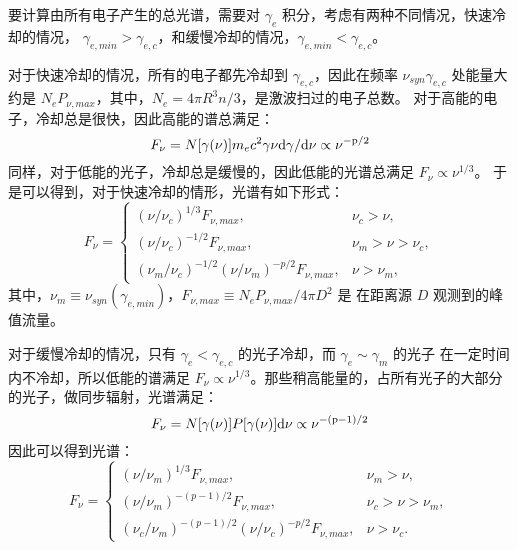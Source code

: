 	要计算由所有电子产生的总光谱，需要对 $\gamma_{e}$ 积分，考虑有两种不同情况，快速冷却的情况，
	$\gamma_{e,min}>\gamma_{e,c}$，和缓慢冷却的情况，$\gamma_{e,min}<\gamma_{e,c}$。

	对于快速冷却的情况，所有的电子都先冷却到 $\gamma_{e,c}$，因此在频率 $\nu_{syn}{\gamma_{e,c}}$
	处能量大约是 $N_{e}P_{\nu,max}$，其中，$N_{e}=4\pi R^{3}n/3$，是激波扫过的电子总数。
	对于高能的电子，冷却总是很快，因此高能的谱总满足：
	\begin{equation}
	F_{\nu}=N[\gamma(\nu)]m_{e}c^{2}\gamma{\nu}\rm{d}\gamma/\rm{d}\nu\propto\nu^{-p/2}
	\end{equation}
	同样，对于低能的光子，冷却总是缓慢的，因此低能的光谱总满足 $F_{\nu}\propto\nu^{1/3}$。
	于是可以得到，对于快速冷却的情形，光谱有如下形式：
	\begin{equation}
	F_\nu=
	\begin{cases}
	( \nu / \nu_c )^{1/3}F_{\nu,max}, & \nu_c>\nu, \\
		( \nu / \nu_c )^{-1/2}F_{\nu,max}, & \nu_m>\nu>\nu_c, \\
		( \nu_m / \nu_c )^{-1/2}( \nu / \nu_m)^{-p/2}F_{\nu,max}, & \nu>\nu_m,
	\end{cases}
	\end{equation}
	其中，$\nu_{m} \equiv \nu_{syn}(\gamma_{e,min})$，$F_{\nu,max}\equiv N_eP_{\nu,max}/4\pi D^2$ 是
	在距离源 $D$ 观测到的峰值流量。

	对于缓慢冷却的情况，只有 $\gamma_{e}<\gamma_{e,c}$ 的光子冷却，而 $\gamma_{e}\sim\gamma_m$ 的光子
	在一定时间内不冷却，所以低能的谱满足 $F_{\nu}\propto\nu^{1/3}$。那些稍高能量的，占所有光子的大部分
	的光子，做同步辐射，光谱满足：
	\begin{equation}
	F_{\nu}=N[\gamma(\nu)]P[\gamma(\nu)]\rm{d}\nu\propto\nu^{-(p-1)/2}
	\end{equation}
	因此可以得到光谱：
	\begin{equation}
	\label{spectrumslow}
	F_\nu=
	\begin{cases}
	(\nu/\nu_m)^{1/3}F_{\nu,max},
	            & \nu_m>\nu, \\
								(\nu/\nu_m)^{-(p-1)/2}F_{\nu,max},
							            & \nu_c>\nu>\nu_m, \\
														\left( \nu_c/\nu_m \right)^{-(p-1)/2}
														\left( \nu/\nu_c \right)^{-p/2}F_{\nu,max},
														            & \nu>\nu_c.
																				\end{cases}
																				\end{equation}

